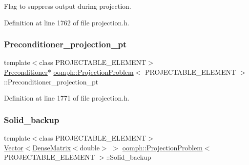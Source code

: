 Flag to suppress output during projection. 



Definition at line 1762 of file projection.\+h.

\mbox{\label{classoomph_1_1ProjectionProblem_ac351713a8fba2e5595955afaf65ab22a}} 
\subsubsection{\texorpdfstring{Preconditioner\+\_\+projection\+\_\+pt}{Preconditioner\_projection\_pt}}
{\footnotesize\ttfamily template$<$class P\+R\+O\+J\+E\+C\+T\+A\+B\+L\+E\+\_\+\+E\+L\+E\+M\+E\+NT$>$ \\
\hyperlink{classoomph_1_1Preconditioner}{Preconditioner}$\ast$ \hyperlink{classoomph_1_1ProjectionProblem}{oomph\+::\+Projection\+Problem}$<$ P\+R\+O\+J\+E\+C\+T\+A\+B\+L\+E\+\_\+\+E\+L\+E\+M\+E\+NT $>$\+::Preconditioner\+\_\+projection\+\_\+pt\hspace{0.3cm}{\ttfamily [private]}}



Definition at line 1771 of file projection.\+h.

\mbox{\label{classoomph_1_1ProjectionProblem_af085e8e2152466d7a98eebff07ea9271}} 
\subsubsection{\texorpdfstring{Solid\+\_\+backup}{Solid\_backup}}
{\footnotesize\ttfamily template$<$class P\+R\+O\+J\+E\+C\+T\+A\+B\+L\+E\+\_\+\+E\+L\+E\+M\+E\+NT$>$ \\
\hyperlink{classoomph_1_1Vector}{Vector}$<$\hyperlink{classoomph_1_1DenseMatrix}{Dense\+Matrix}$<$double$>$ $>$ \hyperlink{classoomph_1_1ProjectionProblem}{oomph\+::\+Projection\+Problem}$<$ P\+R\+O\+J\+E\+C\+T\+A\+B\+L\+E\+\_\+\+E\+L\+E\+M\+E\+NT $>$\+::Solid\+\_\+backup\hspace{0.3cm}{\ttfamily [private]}}



